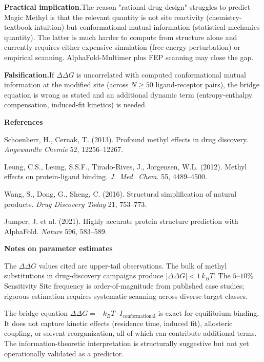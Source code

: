 \documentclass[12pt]{article}
\begin{document}
\bigskip

\medskip\noindent\textbf{Practical implication.}\quad The reason "rational drug design" struggles to predict Magic Methyl is that the relevant quantity is not site reactivity (chemistry-textbook intuition) but conformational mutual information (statistical-mechanics quantity). The latter is much harder to compute from structure alone and currently requires either expensive simulation (free-energy perturbation) or empirical scanning. AlphaFold-Multimer plus FEP scanning may close the gap.

\bigskip

\medskip\noindent\textbf{Falsification.}\quad If $\Delta\Delta G$ is uncorrelated with computed conformational mutual information at the modified site (across $N \geq 50$ ligand-receptor pairs), the bridge equation is wrong as stated and an additional dynamic term (entropy-enthalpy compensation, induced-fit kinetics) is needed.

\newpage

\noindent\textbf{References}

\medskip
\noindent[1] Schoenherr, H., Cernak, T. (2013). Profound methyl effects in drug discovery. \textit{Angewandte Chemie} 52, 12256--12267.

\medskip
\noindent[2] Leung, C.S., Leung, S.S.F., Tirado-Rives, J., Jorgensen, W.L. (2012). Methyl effects on protein-ligand binding. \textit{J.\ Med.\ Chem.} 55, 4489--4500.

\medskip
\noindent[3] Wang, S., Dong, G., Sheng, C. (2016). Structural simplification of natural products. \textit{Drug Discovery Today} 21, 753--773.

\medskip
\noindent[4] Jumper, J. et al. (2021). Highly accurate protein structure prediction with AlphaFold. \textit{Nature} 596, 583--589.

\vspace{0.5cm}

\noindent\textbf{Notes on parameter estimates}

\medskip
\noindent The $\Delta\Delta G$ values cited are upper-tail observations. The bulk of methyl substitutions in drug-discovery campaigns produce $|\Delta\Delta G| < 1\,k_B T$. The $5$--$10\%$ Sensitivity Site frequency is order-of-magnitude from published case studies; rigorous estimation requires systematic scanning across diverse target classes.

\medskip
\noindent The bridge equation $\Delta\Delta G = -k_B T \cdot I_{\text{conformational}}$ is exact for equilibrium binding. It does not capture kinetic effects (residence time, induced fit), allosteric coupling, or solvent reorganization, all of which can contribute additional terms. The information-theoretic interpretation is structurally suggestive but not yet operationally validated as a predictor.
\end{document}
